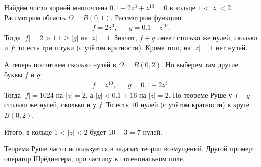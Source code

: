 \documentclass[../complex-analysis.tex]{subfiles}
\begin{document}
 \begin{exmpl}
  Найдём число корней многочлена $ 0.1+2z^{3} + z^{10} = 0 $ в кольце $ 1 < \left| z \right|  < 2 $. Рассмотрим область $ \Omega = B(0,1) $. Рассмотрим функцию
  \begin{align*}
   f = 2z^{3}, &&g = 0.1 + z^{10}.
  \end{align*} 
  Тогда $ \left| f \right| = 2 > 1.1 \geqslant \left| g \right| $ на $ \left| z \right|=1 $. Значит, $f + g$
  имеет столько же нулей, сколько и $ f $: то есть три штуки (с учётом кратности). Кроме того, на $ \left| z \right| = 1 $ нет нулей.

  А теперь посчитаем сколько нулей в $ \Omega=B(0,2) $. Но выберем там другие буквы $ f $ и $ g $:
  \begin{align*}
   f = z^{10}, && g = 0.1  + 2z^{3}.
  \end{align*} Тогда $ \left| f \right| = 1024 $ на $ \left| z \right|=2 $, а $ \left| g \right| < 0.1 + 16 $ на $ \left| z \right| = 2 $. По теореме Руше у $ f+g $ столько же нулей, сколько и у $ f $. То есть $ 10 $ нулей (с учётом кратности) в круге $ B(0, 2) $. 

  Итого, в кольце $ 1 < \left| z \right| < 2 $ будет $ 10-3 = 7 $ нулей.
 \end{exmpl}

 Теорема Руше часто используется в задачах теории возмущений. Другой пример: оператор Шрёдингера, про частицу в потенциальном поле.
\end{document}
